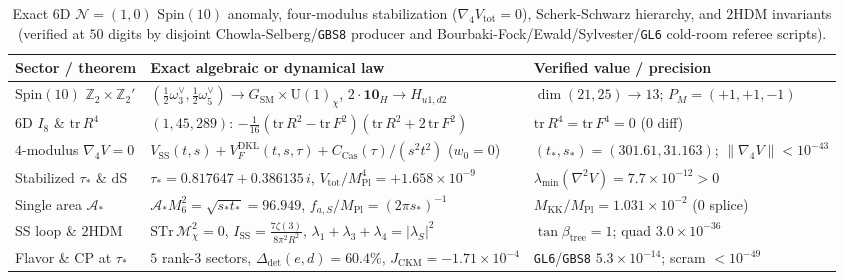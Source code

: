 \documentclass[aps,prd,twocolumn,nofootinbib,floatfix]{revtex4-2}
\begin{document}
\begin{table}[t]
\caption{Exact $6\mathrm{D}$ $\mathcal{N}=(1,0)$ $\mathrm{Spin}(10)$ anomaly, four-modulus stabilization ($\nabla_4 V_{\mathrm{tot}} = 0$), Scherk-Schwarz hierarchy, and $2\mathrm{HDM}$ invariants (verified at $50$ digits by disjoint Chowla-Selberg/\texttt{GBS8} producer and Bourbaki-Fock/Ewald/Sylvester/\texttt{GL6} cold-room referee scripts).}
\label{tab:bulk_link1}
\begin{ruledtabular}
\begin{tabular}{lll}
Sector / theorem & Exact algebraic or dynamical law & Verified value / precision \\
\hline
$\mathrm{Spin}(10)$ $\mathbb{Z}_2\times\mathbb{Z}_2'$ & $(\frac{1}{2}\omega_3^\vee, \frac{1}{2}\omega_5^\vee) \to G_{\mathrm{SM}}\times\mathrm{U}(1)_\chi$, $2\cdot\mathbf{10}_H \to H_{u1,d2}$ & $\dim(21,25)\to 13$; $P_M=(+1,+1,-1)$ \\
$6\mathrm{D}$ $I_8$ \& $\mathrm{tr}\,R^4$ & $(1,45,289)$: $-\frac{1}{16}(\mathrm{tr}\,R^2-\mathrm{tr}\,F^2)(\mathrm{tr}\,R^2+2\,\mathrm{tr}\,F^2)$ & $\mathrm{tr}\,R^4 = \mathrm{tr}\,F^4 = 0$ ($0$ diff) \\
$4$-modulus $\nabla_4 V = 0$ & $V_{\mathrm{SS}}(t,s) + V_F^{\mathrm{DKL}}(t,s,\tau) + C_{\mathrm{Cas}}(\tau)/(s^2 t^2)$ ($w_0 = 0$) & $(t_*, s_*) = (301.61, 31.163)$; $\|\nabla_4 V\| < 10^{-43}$ \\
Stabilized $\tau_*$ \& $\mathrm{dS}$ & $\tau_* = 0.817647 + 0.386135\,i$, $V_{\mathrm{tot}}/M_{\mathrm{Pl}}^4 = +1.658\times 10^{-9}$ & $\lambda_{\min}(\nabla^2 V) = 7.7\times 10^{-12} > 0$ \\
Single area $\mathcal{A}_*$ & $\mathcal{A}_* M_6^2 = \sqrt{s_* t_*} = 96.949$, $f_{a,S}/M_{\mathrm{Pl}} = (2\pi s_*)^{-1}$ & $M_{\mathrm{KK}}/M_{\mathrm{Pl}} = 1.031\times 10^{-2}$ ($0$ splice) \\
SS loop \& $2\mathrm{HDM}$ & $\mathrm{STr}\,\mathcal{M}_\chi^2=0$, $I_{\mathrm{SS}}=\frac{7\zeta(3)}{8\pi^2 R^2}$, $\lambda_1+\lambda_3+\lambda_4=|\lambda_S|^2$ & $\tan\beta_{\mathrm{tree}} = 1$; quad $3.0\times 10^{-36}$ \\
Flavor \& CP at $\tau_*$ & $5$ rank-$3$ sectors, $\Delta_{\det}(e,d) = 60.4\%$, $J_{\mathrm{CKM}} = -1.71\times 10^{-4}$ & \texttt{GL6}/\texttt{GBS8} $5.3\times 10^{-14}$; scram $< 10^{-49}$ \\
\end{tabular}
\end{ruledtabular}
\end{table}
\end{document}
